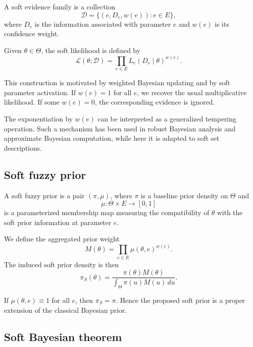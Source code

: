 \documentclass[twoside]{article}
\begin{document}
\begin{dfn}
A soft evidence family is a collection
\[
\mathcal{D}=\{(e, D_e, w(e)) : e\in E\},
\]
where $D_e$ is the information associated with parameter $e$ and $w(e)$ is its confidence weight.
\end{dfn}

\begin{dfn}
Given $\theta\in\Theta$, the soft likelihood is defined by
\[
\mathcal{L}(\theta;\mathcal{D})
=
\prod_{e\in E} L_e(D_e\mid \theta)^{w(e)}.
\]
\end{dfn}

This construction is motivated by weighted Bayesian updating and by soft parameter activation. If $w(e)=1$ for all $e$, we recover the usual multiplicative likelihood. If some $w(e)=0$, the corresponding evidence is ignored.

\begin{rem}
The exponentiation by $w(e)$ can be interpreted as a generalized tempering operation. Such a mechanism has been used in robust Bayesian analysis and approximate Bayesian computation, while here it is adapted to soft set descriptions.
\end{rem}

\subsection{Soft fuzzy prior}

\begin{dfn}
A soft fuzzy prior is a pair $(\pi,\mu)$, where $\pi$ is a baseline prior density on $\Theta$ and
\[
\mu:\Theta\times E \to [0,1]
\]
is a parameterized membership map measuring the compatibility of $\theta$ with the soft prior information at parameter $e$.

We define the aggregated prior weight
\[
M(\theta)=\prod_{e\in E}\mu(\theta,e)^{w(e)}.
\]
The induced soft prior density is then
\[
\pi_S(\theta)=\frac{\pi(\theta)M(\theta)}{\int_\Theta \pi(u)M(u)\,du}.
\]
\end{dfn}

\begin{rem}
If $\mu(\theta,e)\equiv 1$ for all $e$, then $\pi_S=\pi$. Hence the proposed soft prior is a proper extension of the classical Bayesian prior.
\end{rem}

\subsection{Soft Bayesian theorem}
\end{document}
